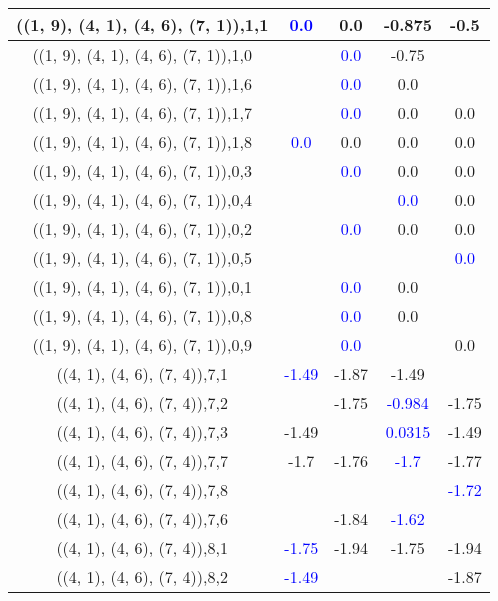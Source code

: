 \documentclass{article}
\begin{document}
\begin{center}
\begin{longtable}{|c|c|c|c|c|}
        	((1, 9), (4, 1), (4, 6), (7, 1)),1,1& \textcolor{blue}{0.0}&0.0&-0.875&-0.5\\
        	\hline
        	((1, 9), (4, 1), (4, 6), (7, 1)),1,0&& \textcolor{blue}{0.0}&-0.75&\\
        	\hline
        	((1, 9), (4, 1), (4, 6), (7, 1)),1,6&& \textcolor{blue}{0.0}&0.0&\\
        	\hline
        	((1, 9), (4, 1), (4, 6), (7, 1)),1,7&& \textcolor{blue}{0.0}&0.0&0.0\\
        	\hline
        	((1, 9), (4, 1), (4, 6), (7, 1)),1,8& \textcolor{blue}{0.0}&0.0&0.0&0.0\\
        	\hline
        	((1, 9), (4, 1), (4, 6), (7, 1)),0,3&& \textcolor{blue}{0.0}&0.0&0.0\\
        	\hline
        	((1, 9), (4, 1), (4, 6), (7, 1)),0,4&&& \textcolor{blue}{0.0}&0.0\\
        	\hline
        	((1, 9), (4, 1), (4, 6), (7, 1)),0,2&& \textcolor{blue}{0.0}&0.0&0.0\\
        	\hline
        	((1, 9), (4, 1), (4, 6), (7, 1)),0,5&&&& \textcolor{blue}{0.0}\\
        	\hline
        	((1, 9), (4, 1), (4, 6), (7, 1)),0,1&& \textcolor{blue}{0.0}&0.0&\\
        	\hline
        	((1, 9), (4, 1), (4, 6), (7, 1)),0,8&& \textcolor{blue}{0.0}&0.0&\\
        	\hline
        	((1, 9), (4, 1), (4, 6), (7, 1)),0,9&& \textcolor{blue}{0.0}&&0.0\\
        	\hline
        	((4, 1), (4, 6), (7, 4)),7,1& \textcolor{blue}{-1.49}&-1.87&-1.49&\\
        	\hline
        	((4, 1), (4, 6), (7, 4)),7,2&&-1.75& \textcolor{blue}{-0.984}&-1.75\\
        	\hline
        	((4, 1), (4, 6), (7, 4)),7,3&-1.49&& \textcolor{blue}{0.0315}&-1.49\\
        	\hline
        	((4, 1), (4, 6), (7, 4)),7,7&-1.7&-1.76& \textcolor{blue}{-1.7}&-1.77\\
        	\hline
        	((4, 1), (4, 6), (7, 4)),7,8&&&& \textcolor{blue}{-1.72}\\
        	\hline
        	((4, 1), (4, 6), (7, 4)),7,6&&-1.84& \textcolor{blue}{-1.62}&\\
        	\hline
        	((4, 1), (4, 6), (7, 4)),8,1& \textcolor{blue}{-1.75}&-1.94&-1.75&-1.94\\
        	\hline
        	((4, 1), (4, 6), (7, 4)),8,2& \textcolor{blue}{-1.49}&&&-1.87\\

\end{longtable}
\end{center}
\end{document}
